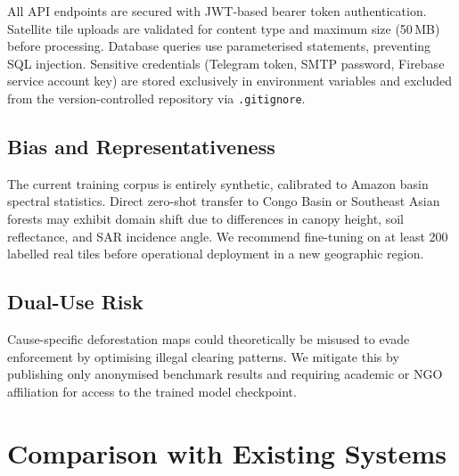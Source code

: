 \documentclass[10pt,conference]{IEEEtran}
\begin{document}
All API endpoints are secured with JWT-based bearer token authentication.
Satellite tile uploads are validated for content type and maximum size (50\,MB)
before processing. Database queries use parameterised statements, preventing
SQL injection. Sensitive credentials (Telegram token, SMTP password, Firebase
service account key) are stored exclusively in environment variables and excluded
from the version-controlled repository via \texttt{.gitignore}.

\subsection{Bias and Representativeness}

The current training corpus is entirely synthetic, calibrated to Amazon basin
spectral statistics. Direct zero-shot transfer to Congo Basin or Southeast
Asian forests may exhibit domain shift due to differences in canopy height,
soil reflectance, and SAR incidence angle. We recommend fine-tuning on at
least 200 labelled real tiles before operational deployment in a new geographic
region.

\subsection{Dual-Use Risk}

Cause-specific deforestation maps could theoretically be misused to evade
enforcement by optimising illegal clearing patterns. We mitigate this by
publishing only anonymised benchmark results and requiring academic or NGO
affiliation for access to the trained model checkpoint.

\section{Comparison with Existing Systems}
\label{sec:comparison}
\end{document}
